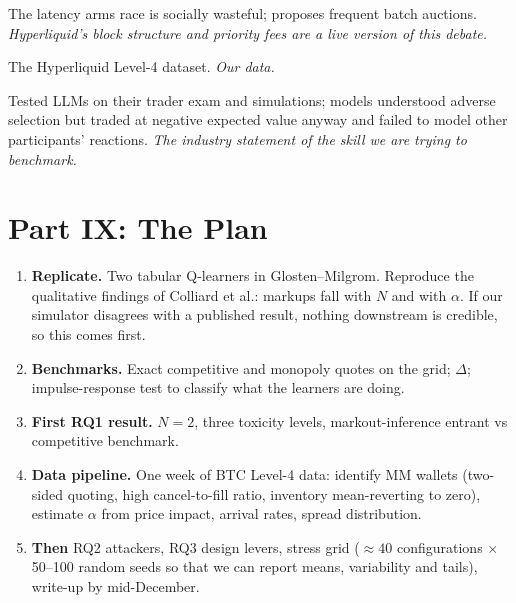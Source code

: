 \documentclass[11pt]{article}
\begin{document}
\begin{description}[style=nextline]
\item[Budish, Cramton \& Shim (QJE 2015).] The latency arms race is socially wasteful; proposes frequent batch auctions. \emph{Hyperliquid's block structure and priority fees are a live version of this debate.}
\item[Albers, Cucuringu, Howison \& Shestopaloff (2026).] The Hyperliquid Level-4 dataset. \emph{Our data.}
\item[Optiver blog (2026).] Tested LLMs on their trader exam and simulations; models understood adverse selection but traded at negative expected value anyway and failed to model other participants' reactions. \emph{The industry statement of the skill we are trying to benchmark.}
\end{description}

\section{Part IX: The Plan}
\begin{enumerate}
\item \textbf{Replicate.} Two tabular Q-learners in Glosten--Milgrom. Reproduce the qualitative findings of Colliard et al.: markups fall with $N$ and with $\alpha$. If our simulator disagrees with a published result, nothing downstream is credible, so this comes first.
\item \textbf{Benchmarks.} Exact competitive and monopoly quotes on the grid; $\Delta$; impulse-response test to classify what the learners are doing.
\item \textbf{First RQ1 result.} $N=2$, three toxicity levels, markout-inference entrant vs competitive benchmark.
\item \textbf{Data pipeline.} One week of BTC Level-4 data: identify MM wallets (two-sided quoting, high cancel-to-fill ratio, inventory mean-reverting to zero), estimate $\alpha$ from price impact, arrival rates, spread distribution.
\item \textbf{Then} RQ2 attackers, RQ3 design levers, stress grid ($\approx40$ configurations $\times$ 50--100 random seeds so that we can report means, variability and tails), write-up by mid-December.
\end{enumerate}
\end{document}

